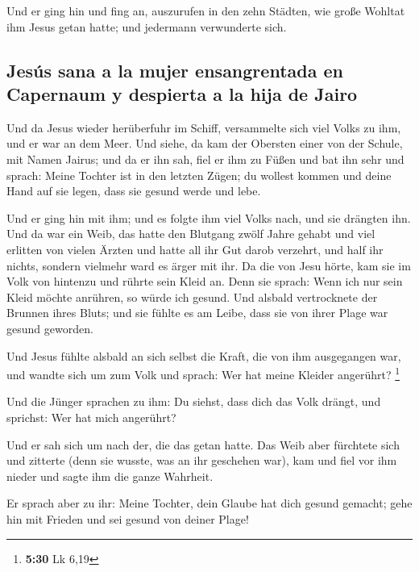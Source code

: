 Und er ging hin und fing an, auszurufen in den zehn
Städten, wie große Wohltat ihm Jesus getan hatte; und jedermann
verwunderte sich.

\hypertarget{jesuxfas-sana-a-la-mujer-ensangrentada-en-capernaum-y-despierta-a-la-hija-de-jairo}{%
\subsection{Jesús sana a la mujer ensangrentada en Capernaum y despierta
a la hija de
Jairo}\label{jesuxfas-sana-a-la-mujer-ensangrentada-en-capernaum-y-despierta-a-la-hija-de-jairo}}

 Und da Jesus wieder herüberfuhr im Schiff, versammelte
sich viel Volks zu ihm, und er war an dem Meer.  Und
siehe, da kam der Obersten einer von der Schule, mit Namen Jairus; und
da er ihn sah, fiel er ihm zu Füßen  und bat ihn sehr und
sprach: Meine Tochter ist in den letzten Zügen; du wollest kommen und
deine Hand auf sie legen, dass sie gesund werde und lebe.

 Und er ging hin mit ihm; und es folgte ihm viel Volks
nach, und sie drängten ihn.  Und da war ein Weib, das
hatte den Blutgang zwölf Jahre gehabt  und viel erlitten
von vielen Ärzten und hatte all ihr Gut darob verzehrt, und half ihr
nichts, sondern vielmehr ward es ärger mit ihr.  Da die
von Jesu hörte, kam sie im Volk von hintenzu und rührte sein Kleid an.
 Denn sie sprach: Wenn ich nur sein Kleid möchte
anrühren, so würde ich gesund.  Und alsbald vertrocknete
der Brunnen ihres Bluts; und sie fühlte es am Leibe, dass sie von ihrer
Plage war gesund geworden.

 Und Jesus fühlte alsbald an sich selbst die Kraft, die
von ihm ausgegangen war, und wandte sich um zum Volk und sprach: Wer hat
meine Kleider angerührt? \footnote{\textbf{5:30} Lk 6,19}

 Und die Jünger sprachen zu ihm: Du siehst, dass dich das
Volk drängt, und sprichst: Wer hat mich angerührt?

 Und er sah sich um nach der, die das getan hatte.
 Das Weib aber fürchtete sich und zitterte (denn sie
wusste, was an ihr geschehen war), kam und fiel vor ihm nieder und sagte
ihm die ganze Wahrheit.

 Er sprach aber zu ihr: Meine Tochter, dein Glaube hat
dich gesund gemacht; gehe hin mit Frieden und sei gesund von deiner
Plage!

